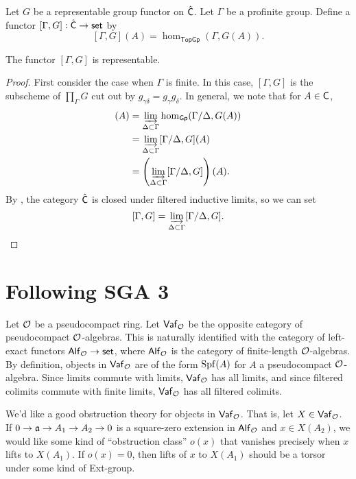 \documentclass[phd,cornellheadings,draft]{cornell}
\begin{document}
Let $G$ be a representable group functor on $\hat{\mathsf{C}}$. 
Let $\Gamma$ be a profinite group. 
Define a functor $[\Gamma,G]:\hat{\mathsf{C}}\to \mathsf{set}$ by 
\[
  [\Gamma,G](A) = \hom_\mathsf{TopGp}(\Gamma,G(A)) .
\]
\begin{proposition}
The functor $[\Gamma,G]$ is representable. 
\end{proposition}
\begin{proof}
First consider the case when $\Gamma$ is finite. In this case, 
$[\Gamma,G]$ is the subscheme of $\prod_\Gamma G$ cut out by 
$g_{\gamma\delta} = g_\gamma g_\delta$. In general, we note that for 
$A\in \mathsf{C}$, 
\begin{align*}
  [\Gamma,G](A) 
    &= \varinjlim_{\Delta\subset \Gamma} \hom_\mathsf{Gp}(\Gamma/\Delta,G(A)) \\
    &= \varinjlim_{\Delta\subset \Gamma} [\Gamma/\Delta,G](A) \\
    &= \left(\varinjlim_{\Delta\subset \Gamma} [\Gamma/\Delta,G]\right)(A) .
\end{align*}
By \cite[$\mathrm{VII_B}$ 1.2.B]{sga3-i}, the category $\hat{\mathsf{C}}$ is 
closed under filtered inductive limits, so we can set 
\[
  [\Gamma,G] = \varinjlim_{\Delta\subset \Gamma} [\Gamma/\Delta,G] .
\]
\end{proof}





\section{Following SGA 3}

Let $\mathcal{O}$ be a pseudocompact ring. Let $\mathsf{Vaf}_{\mathcal{O}}$ be the opposite 
category of pseudocompact $\mathcal{O}$-algebras. This is naturally identified with the 
category of left-exact functors $\mathsf{Alf}_{\mathcal{O}}\to \mathsf{set}$, where 
$\mathsf{Alf}_{\mathcal{O}}$ is the category of finite-length $\mathcal{O}$-algebras. By 
definition, objects in $\mathsf{Vaf}_{\mathcal{O}}$ are of the form 
$\operatorname{Spf}(A)$ for $A$ a pseudocompact $\mathcal{O}$-algebra. Since limits 
commute with limits, $\mathsf{Vaf}_{\mathcal{O}}$ has all limits, and since 
filtered colimits commute with finite limits, $\mathsf{Vaf}_{\mathcal{O}}$ has all 
filtered colimits. 

We'd like a good obstruction theory for objects in $\mathsf{Vaf}_{\mathcal{O}}$. That 
is, let $X\in \mathsf{Vaf}_{\mathcal{O}}$. If $0 \to \mathfrak{a}\to A_1\to A_2\to 0$ is a 
square-zero extension in $\mathsf{Alf}_{\mathcal{O}}$ and $x\in X(A_2)$, we would like 
some kind of ``obstruction class'' $o(x)$ that vanishes precisely when 
$x$ lifts to $X(A_1)$. If $o(x)=0$, then lifts of $x$ to $X(A_1)$ should 
be a torsor under some kind of Ext-group. 
\end{document}
